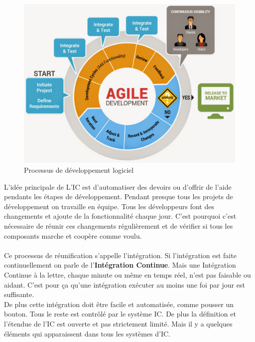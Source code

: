 \begin{figure}[H]
	\centering
		\includegraphics[scale=0.25]{bilder/agile_methodology}
	\caption{Processus de développement logiciel}
	\label{fig:processus}
\end{figure}

L'idée principale de L'IC est d'automatiser des devoirs ou d'offrir de l'aide pendants les étapes de développement. Pendant presque tous les projets de développement on travaille en équipe. Tous les développeurs font des changements et ajoute de la fonctionnalité chaque jour. C'est pourquoi c'est nécessaire de réunir ces changements régulièrement et de vérifier si tous les composants marche et coopère comme voulu.\\\\
Ce processus de réunification s'appelle l'intégration. Si l'intégration est faite continuellement on parle de l'\textbf{Intégration Continue}. Mais une Intégration Continue à la lettre, chaque minute ou même en temps réel, n'est pas faisable ou aidant. C'est pour ça qu'une intégration exécuter au moins une foi par jour est suffisante.\\
De plus cette intégration doit être facile et automatisée, comme pousser un bouton. Tous le reste est contrôlé par le système IC. De plus la définition et l'étendue de l'IC est ouverte et pas strictement limité. Mais il y a quelques éléments qui apparaissent dans tous les systèmes d'IC.
\newpage

